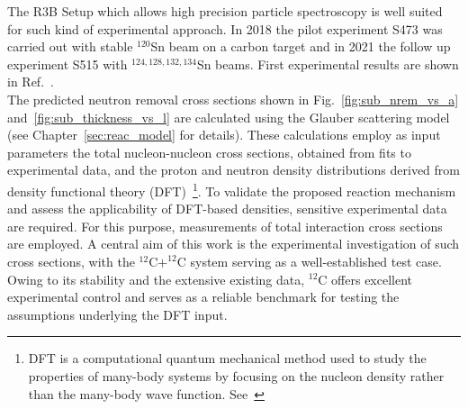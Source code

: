 The R3B Setup which allows high precision particle spectroscopy is well suited for such kind of experimental approach. In 2018 the pilot experiment S473 was carried out with stable $^{120}$Sn beam on a carbon target and in 2021 the follow up experiment S515 with $^{124,128,132,134}$Sn beams. First experimental results are shown in Ref.~\cite{kudaibergenova2024measurements}.\\
The predicted neutron removal cross sections shown in Fig.~\ref{fig:sub_nrem_vs_a} and~\ref{fig:sub_thickness_vs_l} are calculated using the Glauber scattering model (see Chapter~\ref{sec:reac_model} for details). These calculations employ as input parameters the total nucleon-nucleon cross sections, obtained from fits to experimental data, and the proton and neutron density distributions derived from density functional theory (DFT)~\footnote{DFT is a computational quantum mechanical method used to study the properties of many-body systems by focusing on the nucleon density rather than the many-body wave function. See~\cite{gross2013density,colo2020nuclear}}.
To validate the proposed reaction mechanism and assess the applicability of DFT-based densities, sensitive experimental data are required. For this purpose, measurements of total interaction cross sections are employed. A central aim of this work is the experimental investigation of such cross sections, with the $^{12}\mathrm{C} + ^{12}\mathrm{C}$ system serving as a well-established test case.
Owing to its stability and the extensive existing data, $^{12}$C offers excellent experimental control and serves as a reliable benchmark for testing the assumptions underlying the DFT input.


